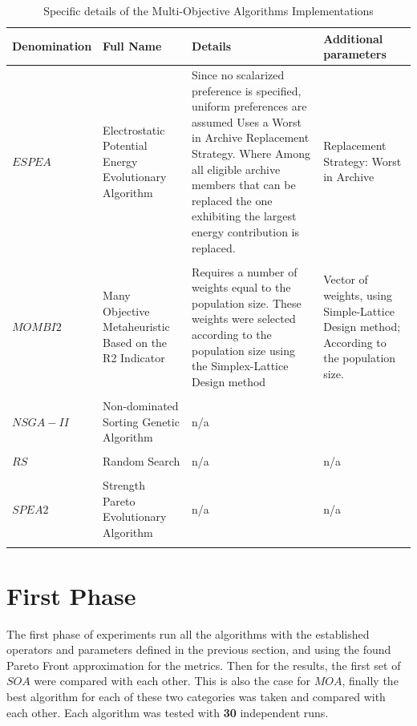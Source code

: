 \begin{table}[]
    \begin{tabular}{p{}p{}p{}p{}}
    \hline
    Denomination  & Full Name & Details & Additional parameters \\
    \hline
    $ESPEA$         & Electrostatic Potential Energy Evolutionary Algorithm  & Since no scalarized preference is specified, uniform preferences are assumed
    Uses a Worst in Archive Replacement Strategy. 
    Where Among all eligible archive members that can be replaced the one exhibiting the largest energy contribution is replaced. & Replacement Strategy: Worst in Archive \\ \\
    $MOMBI2$        & Many Objective Metaheuristic Based on the R2 Indicator & Requires a number of weights equal to the population size. These weights were selected according to the population size using the Simplex-Lattice Design method & Vector of weights, using Simple-Lattice Design method; According to the population size. \\ \\
    $NSGA-II$       & Non-dominated Sorting Genetic Algorithm               & n/a \\ \\
    $RS$           & Random Search                                          & n/a  & n/a \\ \\ 
    $SPEA2$        & Strength Pareto Evolutionary Algorithm                 & n/a  & n/a \\ \\
    \hline                                                                                                                 
    \end{tabular}
    \caption{Specific details of the Multi-Objective Algorithms Implementations}
    \label{table:moa_details}
\end{table}

\section{First Phase}

The first phase of experiments run all the algorithms with the established operators and parameters defined in the previous section, and using the found Pareto Front approximation for the metrics. Then for the results, the first set of $SOA$ were compared with each other. This is also the case for $MOA$, finally the best algorithm for each of these two categories was taken and compared with each other. Each algorithm was tested with \textbf{30} independent runs.

